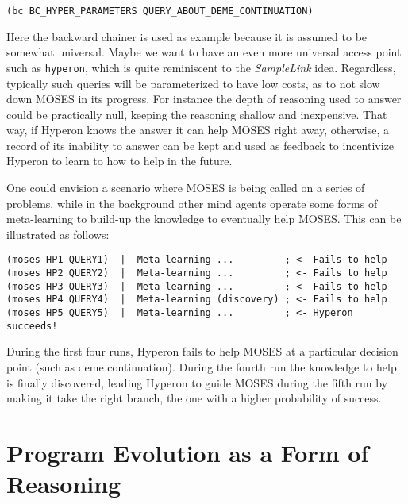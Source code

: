 \documentclass[]{report}
\begin{document}
\begin{verbatim}
(bc BC_HYPER_PARAMETERS QUERY_ABOUT_DEME_CONTINUATION)
\end{verbatim}
Here the backward chainer is used as example because it is assumed to
be somewhat universal.  Maybe we want to have an even more universal
access point such as \texttt{hyperon}, which is quite
reminiscent to the \emph{SampleLink} idea.  Regardless, typically such
queries will be parameterized to have low costs, as to not slow down
MOSES in its progress.  For instance the depth of reasoning used to
answer could be practically null, keeping the reasoning shallow and
inexpensive.  That way, if Hyperon knows the answer it can help MOSES
right away, otherwise, a record of its inability to answer can be kept
and used as feedback to incentivize Hyperon to learn to how to help in
the future.

One could envision a scenario where MOSES is being called on a series
of problems, while in the background other mind agents operate some
forms of meta-learning to build-up the knowledge to eventually help
MOSES.  This can be illustrated as follows:

{\small
\begin{verbatim}
(moses HP1 QUERY1)  |  Meta-learning ...         ; <- Fails to help
(moses HP2 QUERY2)  |  Meta-learning ...         ; <- Fails to help
(moses HP3 QUERY3)  |  Meta-learning ...         ; <- Fails to help
(moses HP4 QUERY4)  |  Meta-learning (discovery) ; <- Fails to help
(moses HP5 QUERY5)  |  Meta-learning ...         ; <- Hyperon succeeds!
\end{verbatim}
} During the first four runs, Hyperon fails to help MOSES at a
particular decision point (such as deme continuation).  During the
fourth run the knowledge to help is finally discovered, leading
Hyperon to guide MOSES during the fifth run by making it take the
right branch, the one with a higher probability of success.

\section{Program Evolution as a Form of Reasoning}
\label{sec:prgevoreason}
\end{document}

